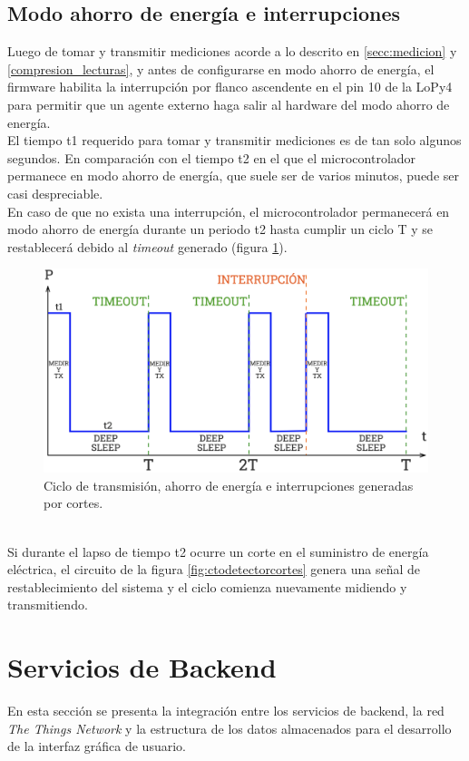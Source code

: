 \subsection{Modo ahorro de energía e interrupciones}
Luego de tomar y transmitir mediciones acorde a lo descrito en \ref{secc:medicion} y \ref{compresion_lecturas}, y antes de configurarse en modo ahorro de energía, el firmware habilita la interrupción por flanco ascendente en el pin 10 de la LoPy4 para permitir que un agente externo haga salir al hardware del modo ahorro de energ\'{i}a.\\
El tiempo t1 requerido para tomar y transmitir mediciones es de tan solo algunos segundos. En comparación con el tiempo t2 en el que el microcontrolador permanece en modo ahorro de energía, que suele ser de varios minutos, puede ser casi despreciable.\\ 
En caso de que no exista una interrupción, el microcontrolador permanecerá en modo ahorro de energía durante un periodo t2 hasta cumplir un ciclo T y se restablecerá debido al \textit{timeout} generado (figura \ref{fig:ciclodeepsleep}).\\
\begin{figure}
	\centering
	\includegraphics[width=1.0\linewidth]{Figures/ciclodeepsleep}
	\caption{Ciclo de transmisión, ahorro de energía e interrupciones generadas por cortes.}
	\label{fig:ciclodeepsleep}
\end{figure}\\
Si durante el lapso de tiempo t2 ocurre un corte en el suministro de energ\'{i}a el\'{e}ctrica, el circuito de la figura \ref{fig:ctodetectorcortes} genera una señal de restablecimiento del sistema y el ciclo comienza nuevamente midiendo y transmitiendo.\\


\section{Servicios de Backend}
\label{seccion_bes}
En esta sección se presenta la integración entre los servicios de backend, la red \textit{The Things Network} y la estructura de los datos almacenados para el desarrollo de la interfaz gráfica de usuario.\\
